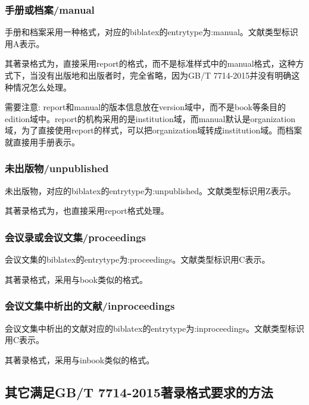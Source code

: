 \subsubsection{手册或档案/manual}
\begin{refentry}{}{}
手册和档案采用一种格式，对应的biblatex的entrytype为:manual。文献类型标识用A表示。

其著录格式为，直接采用report的格式，而不是标准样式中的manual格式，这种方式下，当没有出版地和出版者时，完全省略，因为GB/T 7714-2015并没有明确这种情况怎么处理。
\end{refentry}

需要注意: report和manual的版本信息放在version域中，而不是book等条目的edition域中。report的机构采用的是institution域，而manual默认是organization域，为了直接使用report的样式，可以把organization域转成institution域。而档案就直接用手册表示。

\subsubsection{未出版物/unpublished}
\begin{refentry}{}{}
未出版物，对应的biblatex的entrytype为:unpublished。文献类型标识用Z表示。

其著录格式为，也直接采用report格式处理。
\end{refentry}

\subsubsection{会议录或会议文集/proceedings}
\begin{refentry}{}{}
会议文集的biblatex的entrytype为:proceedings。文献类型标识用C表示。

其著录格式，采用与book类似的格式。
\end{refentry}

\subsubsection{会议文集中析出的文献/inproceedings}
\begin{refentry}{}{}
会议文集中析出的文献对应的biblatex的entrytype为:inproceedings。文献类型标识用C表示。

其著录格式，采用与inbook类似的格式。
\end{refentry}

\subsection{其它满足GB/T 7714-2015著录格式要求的方法}

